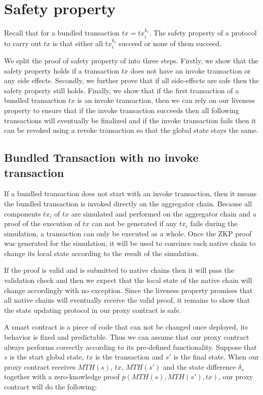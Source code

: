 \documentclass[pageno]{jpaper}
\begin{document}
\section{Safety property}
Recall that for a bundled transaction $tx = {tx_i^{k_i}}$. The safety property of a protocol to carry out $tx$ is that either all $tx_i^{k_i}$ succeed or none of them succeed.

We split the proof of safety property of \dprotocol into three steps. Firstly, we show that the safety property holds if a transaction $tx$ does not have an invoke transaction or any side effects. Secondly, we further prove that if all side-effects are safe then the safety property still holds. Finally, we show that if the first transaction of a bundled transaction $tx$ is an invoke transaction, then we can rely on our liveness property to ensure that if the invoke transaction succeeds then all following transactions will eventually be finalized and if the invoke transaction fails then it can be revoked using a revoke transaction so that the global state stays the same. 

\subsection{Bundled Transaction with no invoke transaction}
If a bundled transaction does not start with an invoke transaction, then it means the bundled transaction is invoked directly on the aggregator chain. Because all components $tx_i$ of $tx$ are simulated and performed on the aggregator chain and a proof of the execution of $tx$ can not be generated if any $tx_i$ fails during the simulation, a transaction can only be executed as a whole. Once the ZKP proof was generated for the simulation, it will be used to convince each native chain to change its local state according to the result of the simulation.

If the proof is valid and is submitted to native chains then it will pass the validation check and then we expect that the local state of the native chain will change accordingly with no exception. Since the liveness property promises that all native chains will eventually receive the valid proof, it remains to show that the state updating protocol in our proxy contract is safe.

A smart contract is a piece of code that can not be changed once deployed, its behavior is fixed and predictable. Thus we can assume that our proxy contract always performs correctly according to its pre-defined functionality. Suppose that $s$ is the start global state, $tx$ is the transaction and $s'$ is the final state. When our proxy contract receives $MTH(s)$, $tx$, $MTH(s')$ and the state difference $\delta_{s}$ together with a zero-knowledge proof $p(MTH(s), MTH(s'), tx)$, our proxy contract will do the following:
\end{document}
